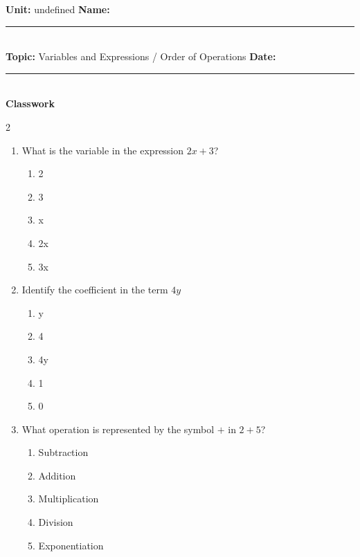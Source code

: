 \documentclass[10pt]{article}
\begin{document}
\enlargethispage{2.5cm}

\begin{tcolorbox}[colback=mainblue!5, colframe=mainblue, sharp corners, boxrule=0.5pt]
    \small \textbf{Unit:} undefined \hfill \textbf{Name:} \rule{3cm}{0.4pt} \\
    \small \textbf{Topic:} Variables and Expressions / Order of Operations \hfill \textbf{Date:} \rule{2cm}{0.4pt} \\
    \centering \textbf{\large Classwork}
\end{tcolorbox}

\vspace{0.2cm}

\begin{multicols}{2}
\begin{enumerate}[label=\textbf{Q\arabic*.}, leftmargin=*, itemsep=6pt, parsep=0pt]

  \item \small What is the variable in the expression $2x + 3$?
  \begin{enumerate}[label=(\Alph*), leftmargin=0.6cm, nosep, itemsep=2pt]
    \item 2
    \item 3
    \item x
    \item 2x
    \item 3x
  \end{enumerate}

  \item \small Identify the coefficient in the term $4y$
  \begin{enumerate}[label=(\Alph*), leftmargin=0.6cm, nosep, itemsep=2pt]
    \item y
    \item 4
    \item 4y
    \item 1
    \item 0
  \end{enumerate}

  \item \small What operation is represented by the symbol $+$ in $2 + 5$?
  \begin{enumerate}[label=(\Alph*), leftmargin=0.6cm, nosep, itemsep=2pt]
    \item Subtraction
    \item Addition
    \item Multiplication
    \item Division
    \item Exponentiation
  \end{enumerate}


\end{enumerate}
\end{multicols}
\end{document}
